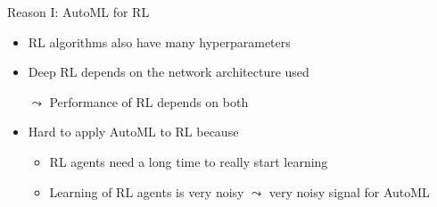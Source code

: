 \begin{frame}[c]{Reason I: AutoML for RL}
	
	\begin{itemize}
		\item RL algorithms also have many hyperparameters 
		\item Deep RL depends on the network architecture used 
		\item[$\leadsto$] Performance of RL depends on both\newline {}
		\pause
		\bigskip
		\item Hard to apply AutoML to RL because
		\begin{itemize}
			\item RL agents need a long time to really start learning 
			\item Learning of RL agents is very noisy $\leadsto$ very noisy signal for AutoML
		\end{itemize}
	\end{itemize}
	
\end{frame}
